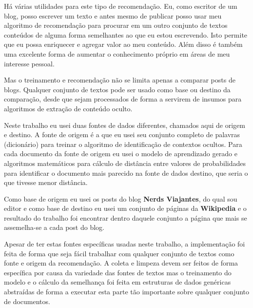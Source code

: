 Há várias utilidades para este tipo de recomendação. Eu, como escritor de um blog, posso escrever um texto e antes mesmo de publicar posso usar 
meu algoritmo de recomendação para procurar em um outro conjunto de textos conteúdos de alguma forma semelhantes ao que eu estou escrevendo. 
Isto permite que eu possa enriquecer e agregar valor ao meu conteúdo. Além disso é também uma excelente forma de aumentar o conhecimento 
próprio em áreas de meu interesse pessoal.

Mas o treinamento e recomendação não se limita apenas a comparar posts de blogs. Qualquer conjunto de textos pode ser usado como base ou destino 
da comparação, desde que sejam processados de forma a servirem de insumos para algoritmos de extração de conteúdo oculto.

Neste trabalho eu usei duas fontes de dados diferentes, chamados aqui de origem e destino. A fonte de origem é a que eu usei seu conjunto completo de 
palavras (dicionário) para treinar o algoritmo de identificação de contextos ocultos. 
Para cada documento da fonte de origem eu usei o modelo de aprendizado gerado e algoritmos matemáticos para cálculo de distância entre valores de 
probabilidades para identificar o documento mais parecido na fonte de dados destino, que seria o que tivesse menor distância.

Como base de origem eu usei os posts do blog \textbf{Nerds Viajantes}, do qual sou editor e como base de destino eu usei um conjunto de páginas 
da \textbf{Wikipedia} e o resultado do trabalho foi encontrar dentro daquele conjunto a página que mais se assemelha-se a cada post do blog.

Apesar de ter estas fontes específicas usadas neste trabalho, a implementação foi feita de forma que seja fácil trabalhar com qualquer conjunto de 
textos como fonte e origem da recomendação. A coleta e limpeza devem ser feitos de forma específica por causa da variedade das fontes de textos mas o 
treinamento do modelo e o cálculo da semelhança foi feita em estruturas de dados genéricas abstraídas de forma a executar esta parte tão importante 
sobre qualquer conjunto de documentos.   
